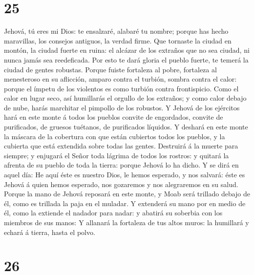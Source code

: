 \hypertarget{section-24}{%
\section{25}\label{section-24}}

 Jehová, tú eres mi Dios: te ensalzaré, alabaré tu nombre;
porque has hecho maravillas, los consejos antiguos, la verdad firme.
 Que tornaste la ciudad en montón, la ciudad fuerte en
ruina: el alcázar de los extraños que no sea ciudad, ni nunca jamás sea
reedeficada.  Por esto te dará gloria el pueblo fuerte, te
temerá la ciudad de gentes robustas.  Porque fuiste
fortaleza al pobre, fortaleza al menesteroso en su aflicción, amparo
contra el turbión, sombra contra el calor: porque el ímpetu de los
violentos es como turbión contra frontispicio.  Como el
calor en lugar seco, así humillarás el orgullo de los extraños; y como
calor debajo de nube, harás marchitar el pimpollo de los robustos.
 Y Jehová de los ejércitos hará en este monte á todos los
pueblos convite de engordados, convite de purificados, de gruesos
tuétanos, de purificados líquidos.  Y deshará en este monte
la máscara de la cobertura con que están cubiertos todos los pueblos, y
la cubierta que está extendida sobre todas las gentes. 
Destruirá á la muerte para siempre; y enjugará el Señor toda lágrima de
todos los rostros: y quitará la afrenta de su pueblo de toda la tierra:
porque Jehová lo ha dicho.  Y se dirá en aquel día: He aquí
éste es nuestro Dios, le hemos esperado, y nos salvará: éste es Jehová á
quien hemos esperado, nos gozaremos y nos alegraremos en su salud.
 Porque la mano de Jehová reposará en este monte, y Moab
será trillado debajo de él, como es trillada la paja en el muladar.
 Y extenderá su mano por en medio de él, como la extiende
el nadador para nadar: y abatirá su soberbia con los miembros de sus
manos:  Y allanará la fortaleza de tus altos muros: la
humillará y echará á tierra, hasta el polvo.

\hypertarget{section-25}{%
\section{26}\label{section-25}}

